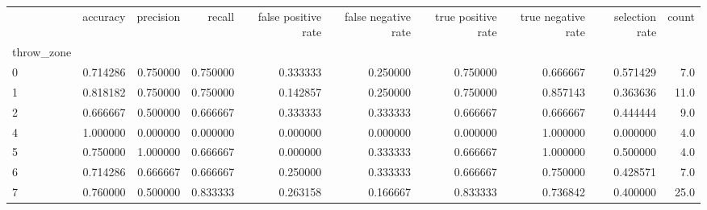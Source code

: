 \begin{tabular}{lrrrrrrrrr}
\toprule
{} &  accuracy &  precision &    recall &  false positive rate &  false negative rate &  true positive rate &  true negative rate &  selection rate &  count \\
throw\_zone &           &            &           &                      &                      &                     &                     &                 &        \\
\midrule
0          &  0.714286 &   0.750000 &  0.750000 &             0.333333 &             0.250000 &            0.750000 &            0.666667 &        0.571429 &    7.0 \\
1          &  0.818182 &   0.750000 &  0.750000 &             0.142857 &             0.250000 &            0.750000 &            0.857143 &        0.363636 &   11.0 \\
2          &  0.666667 &   0.500000 &  0.666667 &             0.333333 &             0.333333 &            0.666667 &            0.666667 &        0.444444 &    9.0 \\
4          &  1.000000 &   0.000000 &  0.000000 &             0.000000 &             0.000000 &            0.000000 &            1.000000 &        0.000000 &    4.0 \\
5          &  0.750000 &   1.000000 &  0.666667 &             0.000000 &             0.333333 &            0.666667 &            1.000000 &        0.500000 &    4.0 \\
6          &  0.714286 &   0.666667 &  0.666667 &             0.250000 &             0.333333 &            0.666667 &            0.750000 &        0.428571 &    7.0 \\
7          &  0.760000 &   0.500000 &  0.833333 &             0.263158 &             0.166667 &            0.833333 &            0.736842 &        0.400000 &   25.0 \\
\bottomrule
\end{tabular}

